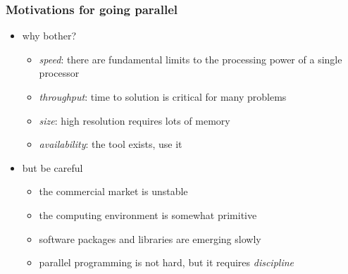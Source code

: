 %
%
%
%


\begin{frame}[fragile]
%
  \frametitle{Motivations for going parallel}
%
  \begin{itemize}
%
  \item why bother?
    \begin{itemize}
    \item {\em speed}: there are fundamental limits to the processing power of a single processor
    \item {\em throughput}: time to solution is critical for many problems
    \item {\em size}: high resolution requires lots of memory
    \item {\em availability}: the tool exists, use it
    \end{itemize}
%
  \item but be careful
    \begin{itemize}
    \item the commercial market is unstable
    \item the computing environment is somewhat primitive
    \item software packages and libraries are emerging slowly
    \item parallel programming is not hard, but it requires {\em discipline}
    \end{itemize}
%
  \end{itemize}
%
\end{frame}

